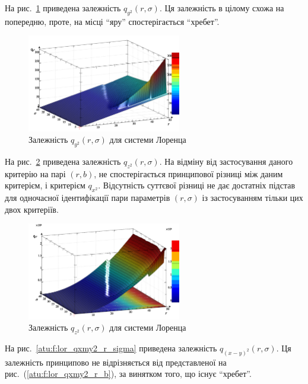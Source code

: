 На рис.~\ref{atu:f:lor_qy2_r_sigma} приведена залежність
$q_{y^2}(r,\sigma)$.
Ця залежність в цілому схожа на попередню, проте, на місці ``яру'' спостерігається ``хребет''.

\begin{figure}[htb!]
  \begin{center}
    \includegraphics[width=0.60\textwidth]{p/cha/lor/q2d/lor_qy2_r_sigma.png}
  \end{center}
  \caption{Залежність $q_{y^2}(r,\sigma)$ для системи Лоренца}
  \label{atu:f:lor_qy2_r_sigma}
\end{figure}

На рис.~\ref{atu:f:lor_qz2_r_sigma} приведена залежність
$q_{z^2}(r,\sigma)$. На відміну від застосування даного критерію
на парі
$(r,b)$, не спостерігається принципової різниці між даним
критерієм, і критерієм
$q_{x^2}$. Відсутність суттєвої різниці не дає достатніх підстав
для одночасної ідентифікації пари параметрів
$(r, \sigma) $ із застосуванням тільки цих двох критеріїв.

\begin{figure}[htb!]
  \begin{center}
    \includegraphics[width=0.60\textwidth]{p/cha/lor/q2d/lor_qz2_r_sigma.png}
  \end{center}
  \caption{Залежність $q_{z^2}(r,\sigma)$ для системи Лоренца}
  \label{atu:f:lor_qz2_r_sigma}
\end{figure}

На рис.~\ref{atu:f:lor_qxmy2_r_sigma} приведена залежність
$q_{(x-y)^2} (r, \sigma) $. Ця залежність принципово не відрізняється
від представленої на рис.~(\ref{atu:f:lor_qxmy2_r_b}), за винятком того, що
існує ``хребет''.

